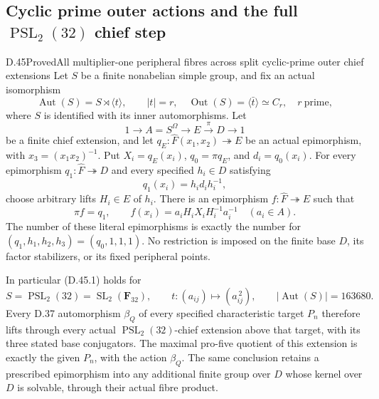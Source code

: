 \subsection{Cyclic prime outer actions and the full \texorpdfstring{$\operatorname{PSL}_2(32)$}{PSL2(32)} chief step}

\begin{statement}{D.45}{Proved}{All multiplier-one peripheral fibres across split cyclic-prime outer chief extensions}
Let \(S\) be a finite nonabelian simple group, and fix an
actual isomorphism
\[
 \operatorname{Aut}(S)=S\rtimes\langle t\rangle,\qquad
 |t|=r,\quad
 \operatorname{Out}(S)=\langle\bar t\rangle\simeq C_r,
 \quad r\ \text{prime},
 \tag{D.45.1}
\]
where \(S\) is identified with its inner automorphisms.
Let
\[
 1\longrightarrow A=S^\Omega\longrightarrow E
       \xrightarrow{\pi}D\longrightarrow1
 \tag{D.45.2}
\]
be a finite chief extension, and let
\(q_E:\widehat F(x_1,x_2)\twoheadrightarrow E\) be an
actual epimorphism, with \(x_3=(x_1x_2)^{-1}\).
Put \(X_i=q_E(x_i)\), \(q_0=\pi q_E\), and \(d_i=q_0(x_i)\).
For every epimorphism \(q_1:\widehat F\twoheadrightarrow D\)
and every specified \(h_i\in D\) satisfying
\[
                    q_1(x_i)=h_id_ih_i^{-1},
 \tag{D.45.3}
\]
choose arbitrary lifts \(H_i\in E\) of \(h_i\).
There is an epimorphism \(f:\widehat F\twoheadrightarrow E\)
such that
\[
 \pi f=q_1,\qquad
 f(x_i)=a_iH_iX_iH_i^{-1}a_i^{-1}
                 \quad(a_i\in A).
 \tag{D.45.4}
\]
The number of these literal epimorphisms is exactly the
number for \((q_1,h_1,h_2,h_3)=(q_0,1,1,1)\).
No restriction is imposed on the finite base \(D\),
its factor stabilizers, or its fixed peripheral points.

In particular \textup{(D.45.1)} holds for
\[
 S=\operatorname{PSL}_2(32)=\operatorname{SL}_2(\mathbf F_{32}),
 \qquad
 t:(a_{ij})\longmapsto(a_{ij}^{\,2}),
 \qquad |\operatorname{Aut}(S)|=163680.
 \tag{D.45.5}
\]
Every D.37 automorphism \(\beta_Q\) of every specified
characteristic target \(P_n\) therefore lifts through
every actual \(\operatorname{PSL}_2(32)\)-chief extension
above that target, with its three stated base conjugators.
The maximal pro-five quotient of this extension is exactly
the given \(P_n\), with the action \(\beta_Q\).
The same conclusion retains a prescribed epimorphism into
any additional finite group over \(D\) whose kernel over
\(D\) is solvable, through their actual fibre product.
\end{statement}

